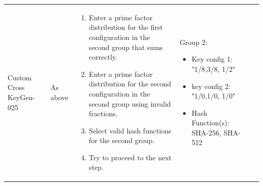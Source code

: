 \documentclass[]{final_report}
\theoremstyle{definition}
\begin{document}
\begin{longtable}{|p{1.5cm}|p{2.5cm}|p{3.5cm}|p{2.5cm}|p{3cm}|p{2cm}|}
  \hline
  Custom
  Cross
  KeyGen-025 & As above & 
  \begin{enumerate}
    \item Enter a prime factor distribution for the first configuration in the second group that sums correctly.
    \item Enter a prime factor distribution for the second configuration in the second group using invalid fractions.
    \item Select valid hash functions for the second group.
    \item Try to proceed to the next step.
  \end{enumerate} & 
      Group 2: 
    \begin{itemize}
 \item Key config 1: "1/8,3/8,
 1/2"
 \item key config 2:  "1/0,1/0,
 1/0"
 \item Hash Function(s): SHA-256, SHA-512
    \end{itemize} 
    

\end{longtable}
\end{document}
